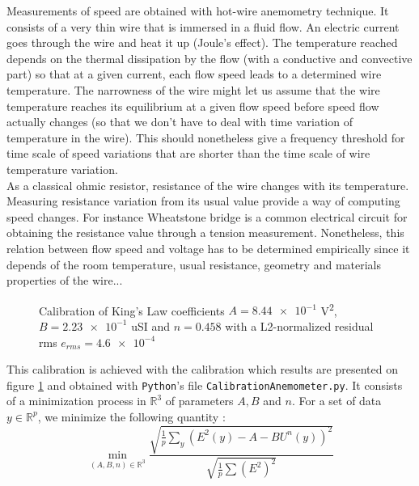 \documentclass[12pt]{article}
\begin{document}
Measurements of speed are obtained with hot-wire anemometry technique. It consists of a very thin wire that is immersed in a fluid flow. An electric current goes through the wire and heat it up (Joule's effect). The temperature reached depends on the thermal dissipation by the flow (with a conductive and convective part) so that at a given current, each flow speed leads to a determined wire temperature. The narrowness of the wire might let us assume that the wire temperature reaches its equilibrium at a given flow speed before speed flow actually changes (so that we don't have to deal with time variation of temperature in the wire). This should nonetheless give a frequency threshold for time scale of speed variations that are shorter than the time scale of wire temperature variation.\\

As a classical ohmic resistor, resistance of the wire changes with its temperature. Measuring resistance variation from its usual value provide a way of computing speed changes. For instance Wheatstone bridge is a common electrical circuit for obtaining the resistance value through a tension measurement. Nonetheless, this relation between flow speed and voltage has to be determined empirically since it depends of the room temperature, usual resistance, geometry and materials properties of the wire...\\

\begin{figure}[ht!]
    \centering
    \resizebox{0.6\linewidth}{!}{}
    \caption{Calibration of King's Law coefficients $A = \num{8.44e-1}$ \si{V^2}, $B = \num{2.23e-1}$ \si{uSI} and $n=0.458$ with a L2-normalized residual rms $e_{rms} = \num{4.6e-4}$}
    \label{fig:AnemometerFitting}
\end{figure}

This calibration is achieved with the calibration which results are presented on figure \ref{fig:AnemometerFitting} and obtained with \verb|Python|'s file \verb|CalibrationAnemometer.py|. It consists of a minimization process in $\mathbb{R}^3$ of parameters $A,B$ and $n$. For a set of data $y \in \mathbb{R}^p$, we minimize the following quantity : \\ 

\begin{equation}
    \min_{(A,B,n)\in\mathbb{R}^3} \frac{\sqrt{\frac{1}{p} \sum_{y} \left( E^2(y) - A - BU^n(y) \right)^2 }}{\sqrt{ \frac{1}{p} \sum \left( E^2\right)^2}}
\end{equation}
\end{document}
